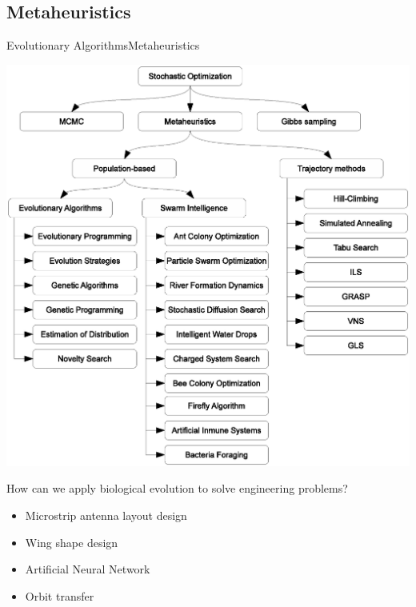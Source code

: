\documentclass[10pt,compress]{beamer} %
\begin{document}
\subsection{Metaheuristics}
\begin{frame}[plain]{Evolutionary Algorithms}{Metaheuristics}
    \vspace{-0.5cm}
	\begin{center}
		\includegraphics[width=0.75\linewidth]{figs/metaheuristics.eps}
	\end{center}
\end{frame}

\begin{frame}[plain]{}
	How can we apply biological evolution to solve engineering problems?
    \begin{itemize}
    \item Microstrip antenna layout design
    \item Wing shape design
    \item Artificial Neural Network
    \item Orbit transfer
    \end{itemize}
\end{frame}
\end{document}

